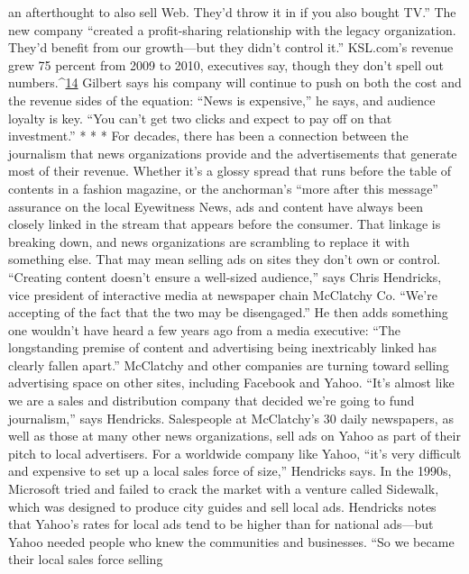 an afterthought to also sell Web. They'd throw it in if you also bought TV.'' The
new company ``created a profit-sharing relationship with the legacy organization.
They'd benefit from our growth—but they didn't control it.''
KSL.com's revenue grew 75 percent from 2009 to 2010, executives say, though
they don't spell out numbers.^{\href{#endnotes-chapter-8}{14}} Gilbert says his company will continue to push
on both the cost and the revenue sides of the equation: ``News is expensive,'' he
says, and audience loyalty is key. ``You can't get two clicks and expect to pay off
on that investment.''
* * *
For decades, there has been a connection between the journalism that news
organizations provide and the advertisements that generate most of their revenue.
Whether it's a glossy spread that runs before the table of contents in a fashion
magazine, or the anchorman's ``more after this message'' assurance on the local
Eyewitness News, ads and content have always been closely linked in the stream
that appears before the consumer.
That linkage is breaking down, and news organizations are scrambling to replace
it with something else. That may mean selling ads on sites they don't own
or control. ``Creating content doesn't ensure a well-sized audience,'' says Chris
Hendricks, vice president of interactive media at newspaper chain McClatchy
Co. ``We're accepting of the fact that the two may be disengaged.'' He then adds
something one wouldn't have heard a few years ago from a media executive:
``The longstanding premise of content and advertising being inextricably linked
has clearly fallen apart.''
McClatchy and other companies are turning toward selling advertising space on
other sites, including Facebook and Yahoo. ``It's almost like we are a sales and distribution
company that decided we're going to fund journalism,'' says Hendricks.
Salespeople at McClatchy's 30 daily newspapers, as well as those at many other
news organizations, sell ads on Yahoo as part of their pitch to local advertisers.
For a worldwide company like Yahoo, ``it's very difficult and expensive to set
up a local sales force of size,'' Hendricks says. In the 1990s, Microsoft tried and
failed to crack the market with a venture called Sidewalk, which was designed
to produce city guides and sell local ads. Hendricks notes that Yahoo's rates for
local ads tend to be higher than for national ads—but Yahoo needed people who
knew the communities and businesses. ``So we became their local sales force selling

